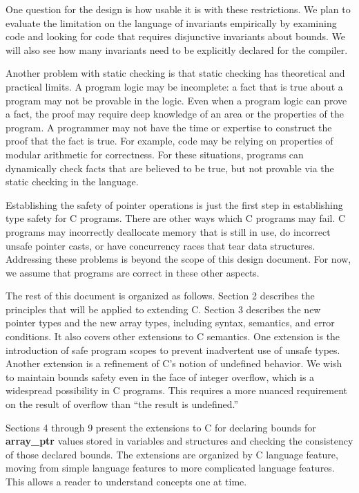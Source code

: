 \documentclass[]{article}
\begin{document}
One question for the design is how usable it is with these restrictions.
We plan to evaluate the limitation on the language of invariants
empirically by examining code and looking for code that requires
disjunctive invariants about bounds. We will also see how many
invariants need to be explicitly declared for the compiler.

Another problem with static checking is that static checking has
theoretical and practical limits. A program logic may be incomplete: a
fact that is true about a program may not be provable in the logic. Even
when a program logic can prove a fact, the proof may require deep
knowledge of an area or the properties of the program. A programmer may
not have the time or expertise to construct the proof that the fact is
true. For example, code may be relying on properties of modular
arithmetic for correctness. For these situations, programs can
dynamically check facts that are believed to be true, but not provable
via the static checking in the language.

Establishing the safety of pointer operations is just the first step in
establishing type safety for C programs. There are other ways which C
programs may fail. C programs may incorrectly deallocate memory that is
still in use, do incorrect unsafe pointer casts, or have concurrency
races that tear data structures. Addressing these problems is beyond the
scope of this design document. For now, we assume that programs are
correct in these other aspects.

The rest of this document is organized as follows. Section 2 describes
the principles that will be applied to extending C. Section 3 describes
the new pointer types and the new array types, including syntax,
semantics, and error conditions. It also covers other extensions to C
semantics. One extension is the introduction of safe program scopes to
prevent inadvertent use of unsafe types. Another extension is a
refinement of C's notion of undefined behavior. We wish to maintain
bounds safety even in the face of integer overflow, which is a
widespread possibility in C programs. This requires a more nuanced
requirement on the result of overflow than ``the result is undefined.''

Sections 4 through 9 present the extensions to C for declaring bounds
for \textbf{array\_ptr} values stored in variables and structures and
checking the consistency of those declared bounds. The extensions are
organized by C language feature, moving from simple language features to
more complicated language features. This allows a reader to understand
concepts one at time.
\end{document}
